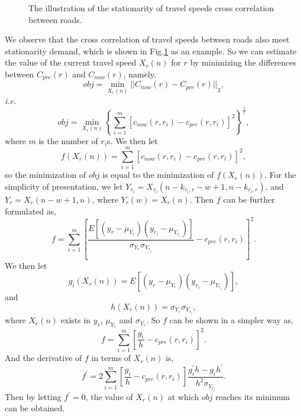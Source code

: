 \documentclass[twocolumn,10pt,final,conference]{IEEEtran}
\def\ie{\textit{i.e.}\xspace}
\begin{document}
\begin{figure}[h]
\centering
{}
\caption{The illustration of the stationarity of travel speeds cross correlation between roads.}
\label{fig-ccf-stationary}
\end{figure}
We observe that the cross correlation of travel speeds between roads also meet stationarity demand, which is shown in Fig.\ref{fig-ccf-stationary} as an example.
So we can estimate the value of the current travel speed $X_r(n)$ for $r$ by minimizing the differences between $C_{pre}(r)$ and $C_{now}(r)$, namely,
\begin{equation}\label{equ-min-obj}
obj=\mathop {\min} \limits_{X_{r}(n)} {||C_{now}(r)-C_{pre}(r)||}_{2},
\end{equation}
\ie
\[
obj=\mathop {\min} \limits_{X_{r}(n)} \left\{\sum_{i=1}^{m}\left[{c_{now}(r,r_i)-c_{pre}(r,r_i)}\right]^{2}\right\}^{\frac{1}{2}},
\]
where $m$ is the number of $r_i$s.
We then let
\[
f(X_r(n))=\sum_{i=1}^{m}\left[{c_{now}(r,r_i)-c_{pre}(r,r_i)}\right]^{2},
\]
so the minimization of $obj$ is equal to the minimization of $f(X_{r}(n))$.
For the simplicity of presentation, we let $Y_{r_i}=X_{r_i}(n-k_{r_i,r}-w+1,n-k_{r_i,r})$, and $Y_{r}=X_r(n-w+1,n)$, where $Y_{r}(w)=X_r(n)$.
Then $f$ can be further formulated as,
\[
f=\sum_{i=1}^{m}\left[{\frac{E[(y_r-\mu_{Y_r})(y_{r_i}-\mu_{Y_{r_i}})]}{\sigma_{Y_r}\sigma_{Y_{r_i}}}-c_{pre}(r,r_i)}\right]^{2}.
\]
We then let
\[
g_i(X_r(n))=E[(y_r-\mu_{Y_r})(y_{r_i}-\mu_{Y_{r_i}})],
\]
and
\[
h(X_r(n))=\sigma_{Y_r}\sigma_{Y_{r_i}},
\]
where $X_{r}(n)$ exists in $y_r$, $\mu_{Y_r}$ and $\sigma_{Y_r}$.
So $f$ can be shown in a simpler way as,
\[
f=\sum_{i=1}^{m}\left[{\frac{g_i}{h}-c_{pre}(r,r_i)}\right]^{2}.
\]
And the derivative of $f$ in terms of $X_{r}(n)$ is,
\begin{equation}\label{equation_f_deri}
f^{'}=2\sum_{i=1}^{m}\left[{\frac{g_i}{h}-c_{pre}(r,r_i)}\right]\frac{g_{i}^{'}h-g_ih^{'}}{h^{2}\sigma_{Y_{r_i}}}.
\end{equation}
Then by letting $f^{'}=0$, the value of $X_{r}(n)$ at which $obj$ reaches its minimum can be obtained.
\end{document}
